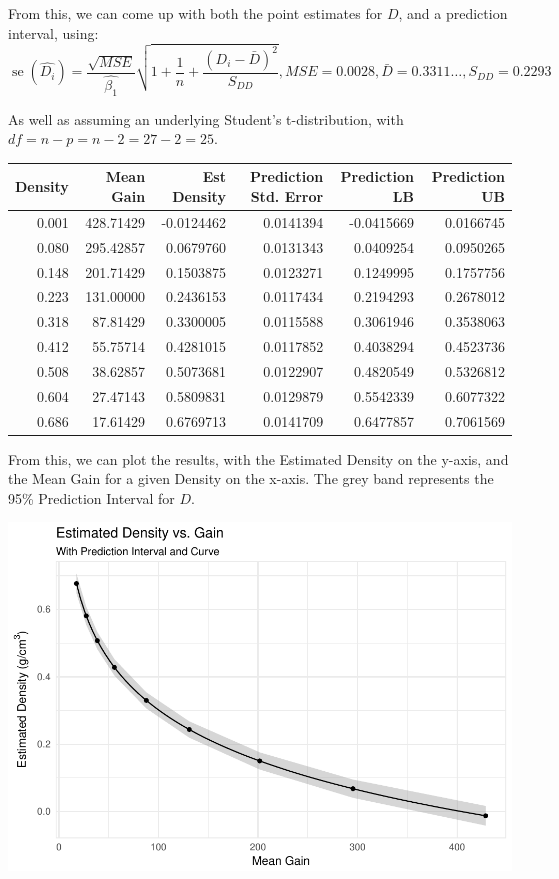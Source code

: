 \documentclass[]{article}
\newcommand{\se}{\operatorname{se}}
\begin{document}
From this, we can come up with both the point estimates for \(D\), and a
prediction interval, using: \[
  \se\left( \hat{D_{i}} \right) =
  \frac{\sqrt{MSE}}{\hat{\beta_{1}}}\sqrt{1 + \frac{1}{n} + \frac{\left( D_{i}-\bar{D} \right)^{2}}{S_{DD}}},
  MSE = 0.0028,
  \bar{D} = 0.3311\dots,
  S_{DD} = 0.2293
\]

As well as assuming an underlying Student's t-distribution, with
\(df=n-p=n-2=27-2=25\).

\begin{longtable}[]{@{}rrrrrr@{}}
\toprule
Density & Mean Gain & Est Density & Prediction Std. Error & Prediction
LB & Prediction UB\tabularnewline
\midrule
\endhead
0.001 & 428.71429 & -0.0124462 & 0.0141394 & -0.0415669 &
0.0166745\tabularnewline
0.080 & 295.42857 & 0.0679760 & 0.0131343 & 0.0409254 &
0.0950265\tabularnewline
0.148 & 201.71429 & 0.1503875 & 0.0123271 & 0.1249995 &
0.1757756\tabularnewline
0.223 & 131.00000 & 0.2436153 & 0.0117434 & 0.2194293 &
0.2678012\tabularnewline
0.318 & 87.81429 & 0.3300005 & 0.0115588 & 0.3061946 &
0.3538063\tabularnewline
0.412 & 55.75714 & 0.4281015 & 0.0117852 & 0.4038294 &
0.4523736\tabularnewline
0.508 & 38.62857 & 0.5073681 & 0.0122907 & 0.4820549 &
0.5326812\tabularnewline
0.604 & 27.47143 & 0.5809831 & 0.0129879 & 0.5542339 &
0.6077322\tabularnewline
0.686 & 17.61429 & 0.6769713 & 0.0141709 & 0.6477857 &
0.7061569\tabularnewline
\bottomrule
\end{longtable}

From this, we can plot the results, with the Estimated Density on the
y-axis, and the Mean Gain for a given Density on the x-axis. The grey
band represents the 95\% Prediction Interval for \(D\).

\includegraphics{Project_05_files/figure-latex/CC Dens vs Gain-1.pdf}
\end{document}
